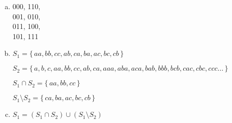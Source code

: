 \documentclass[12pt]{article}
\begin{document}
\begin{enumerate}[a)]
    \item
        000, 110,\\
        001, 010,\\
        011, 100,\\
        101, 111

    \bigskip

    \item
        $S_1 = \{\,aa,bb,cc,ab,ca,ba,ac,bc,cb\,\}$

        $S_2 = \{\,a,b,c,aa,bb,cc,ab,ca,aaa,aba,aca,bab,bbb,bcb,cac,cbc,ccc\dots\,\}$

        \bigskip

        $S_1 \cap S_2 = \{\,aa,bb,cc\,\}$

        $S_1 \setminus S_2 = \{\,ca,ba,ac,bc,cb\,\}$

    \bigskip

    \item
        $S_1 = (S_1 \cap S_2) \cup (S_1 \setminus S_2)$
\end{enumerate}
\end{document}
